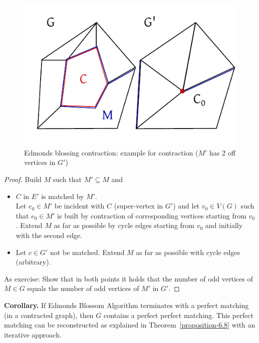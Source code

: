 \documentclass[a4paper]{article}
\theoremstyle{definition}
\begin{document}
\begin{figure}[t]
  \begin{center}
    \includegraphics{img/blossom_contraction.pdf}
    \caption{Edmonds blossing contraction: example for contraction ($M'$ has 2 off vertices in $G'$)}
  \end{center}
\end{figure}

\begin{proof}
  Build $M$ such that $M' \subseteq M$ and
  \begin{itemize}
    \item $C$ in $E'$ is matched by $M'$. \\
      Let $e_0 \in M'$ be incident with $C$ (super-vertex in $G'$) and let $v_0 \in V(G)$ such that $e_0 \in M'$ is built by contraction of corresponding vertices starting from $v_0$. Extend $M$ as far as possible by cycle edges starting from $v_0$ and initially with the second edge.
    \item Let $c \in G'$ not be matched. Extend $M$ as far as possible with cycle edges (arbitrary).
  \end{itemize}

  As exercise: Show that in both points it holds that the number of odd vertices of $M \in G$ equals the number of odd vertices of $M'$ in $G'$.
\end{proof}

\textbf{Corollary.}
  If Edmonds Blossom Algorithm terminates with a perfect matching (in a contracted graph), then $G$ contains a perfect perfect matching. This perfect matching can be reconstructed as explained in Theorem~\ref{proposition-6.8} with an iterative approach.
\end{document}
